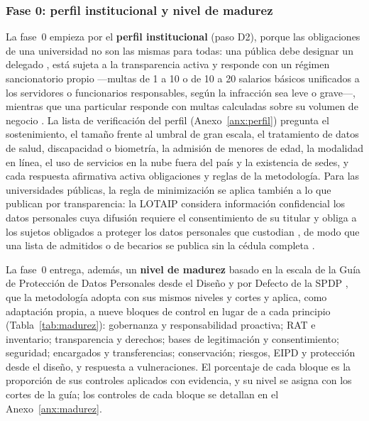 \subsubsection{Fase 0: perfil institucional y nivel de madurez}
\label{sec:fase0_madurez}

La fase~0 empieza por el \textbf{perfil institucional} (paso D2), porque las obligaciones de una universidad no son las mismas para todas: una pública debe designar un delegado \cite[art.~48, num.~1]{lopdp2021}, está sujeta a la transparencia activa \cite[arts.~8, lit.~g, y 19]{lotaip2023} y responde con un régimen sancionatorio propio ---multas de 1 a 10 o de 10 a 20 salarios básicos unificados a los servidores o funcionarios responsables, según la infracción sea leve o grave---, mientras que una particular responde con multas calculadas sobre su volumen de negocio \cite[arts.~71 y 72]{lopdp2021}. La lista de verificación del perfil (Anexo~\ref{anx:perfil}) pregunta el sostenimiento, el tamaño frente al umbral de gran escala, el tratamiento de datos de salud, discapacidad o biometría, la admisión de menores de edad, la modalidad en línea, el uso de servicios en la nube fuera del país y la existencia de sedes, y cada respuesta afirmativa activa obligaciones y reglas de la metodología. Para las universidades públicas, la regla de minimización se aplica también a lo que publican por transparencia: la LOTAIP considera información confidencial los datos personales cuya difusión requiere el consentimiento de su titular y obliga a los sujetos obligados a proteger los datos personales que custodian \cite[arts.~4, num.~5, y 9]{lotaip2023}, de modo que una lista de admitidos o de becarios se publica sin la cédula completa \cite[art.~10, lit.~e]{lopdp2021}.

La fase~0 entrega, además, un \textbf{nivel de madurez} basado en la escala de la Guía de Protección de Datos Personales desde el Diseño y por Defecto de la SPDP \cite{spdp2025diseno}, que la metodología adopta con sus mismos niveles y cortes \cite[cap.~3]{spdp2025diseno} y aplica, como adaptación propia, a nueve bloques de control en lugar de a cada principio (Tabla~\ref{tab:madurez}): gobernanza y responsabilidad proactiva; RAT e inventario; transparencia y derechos; bases de legitimación y consentimiento; seguridad; encargados y transferencias; conservación; riesgos, EIPD y protección desde el diseño, y respuesta a vulneraciones. El porcentaje de cada bloque es la proporción de sus controles aplicados con evidencia, y su nivel se asigna con los cortes de la guía; los controles de cada bloque se detallan en el Anexo~\ref{anx:madurez}.

